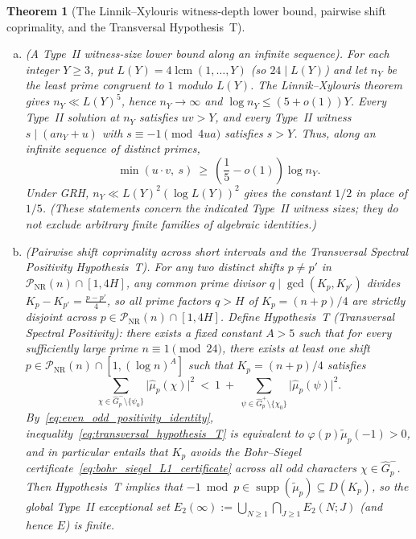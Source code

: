\documentclass[11pt, a4paper]{article}
\theoremstyle{plain}
\newtheorem{theorem}{Theorem}[section]
\theoremstyle{definition}
\begin{document}
\begin{theorem}[The Linnik--Xylouris witness-depth lower bound, pairwise shift coprimality, and the Transversal Hypothesis~T]\label{thm:no_go_linnik_and_transversal}
\leavevmode
\begin{enumerate}[(a)]
    \item \emph{(A Type~II witness-size lower bound along an infinite sequence).} For each integer $Y\ge3$, put $L(Y)=4\operatorname{lcm}(1,\ldots,Y)$ (so $24\mid L(Y)$) and let $n_Y$ be the least prime congruent to $1$ modulo $L(Y)$. The Linnik--Xylouris theorem~\cite{xylouris2011} gives $n_Y\ll L(Y)^5$, hence $n_Y\longrightarrow\infty$ and $\log n_Y\le(5+o(1))Y$. Every Type~II solution at $n_Y$ satisfies $uv>Y$, and every Type~II witness $s\mid(an_Y+u)$ with $s\equiv-1\pmod{4ua}$ satisfies $s>Y$. Thus, along an infinite sequence of distinct primes,
    \begin{equation}\label{eq:linnik_xylouris_witness_bound}
    \min(u\cdot v,\ s)\ \ge\ \left(\frac{1}{5}-o(1)\right)\log n_Y.
    \end{equation}
    Under GRH, $n_Y\ll L(Y)^2(\log L(Y))^2$ gives the constant $1/2$ in place of $1/5$. (These statements concern the indicated Type~II witness sizes; they do not exclude arbitrary finite families of algebraic identities.)

    \item \emph{(Pairwise shift coprimality across short intervals and the Transversal Spectral Positivity Hypothesis~T).} For any two distinct shifts $p\neq p'$ in $\mathcal{P}_{\mathrm{NR}}(n)\cap[1,4H]$, any common prime divisor $q\mid\gcd(K_p,K_{p'})$ divides $K_p-K_{p'}=\frac{p-p'}{4}$, so all prime factors $q>H$ of $K_p=(n+p)/4$ are strictly disjoint across $p\in\mathcal{P}_{\mathrm{NR}}(n)\cap[1,4H]$. Define \emph{Hypothesis~T (Transversal Spectral Positivity)}: there exists a fixed constant $A>5$ such that for every sufficiently large prime $n\equiv1\pmod{24}$, there exists at least one shift $p\in\mathcal{P}_{\mathrm{NR}}(n)\cap[1,(\log n)^{A}]$ such that $K_p=(n+p)/4$ satisfies
    \begin{equation}\label{eq:transversal_hypothesis_T}
    \sum_{\chi\in\widehat{G}_p^{-}\setminus\{\psi_0\}}\big|\widehat{\mu}_p(\chi)\big|^{2}\ <\ 1\ +\ \sum_{\psi\in\widehat{G}_p^{+}\setminus\{\chi_0\}}\big|\widehat{\mu}_p(\psi)\big|^{2}.
    \end{equation}
    By~\eqref{eq:even_odd_positivity_identity}, inequality~\eqref{eq:transversal_hypothesis_T} is equivalent to $\varphi(p)\widetilde{\mu}_p(-1)>0$, and in particular entails that $K_p$ avoids the Bohr--Siegel certificate~\eqref{eq:bohr_siegel_L1_certificate} across all odd characters $\chi\in\widehat{G}_p^{-}$. Then Hypothesis~T implies that $-1\bmod p\in\operatorname{supp}(\widetilde{\mu}_p)\subseteq D(K_p)$, so the global Type~II exceptional set $E_2(\infty):=\bigcup_{N\ge1}\bigcap_{J\ge1}E_2(N;J)$ (and hence $E$) is finite.
\end{enumerate}
\end{theorem}
\end{document}
